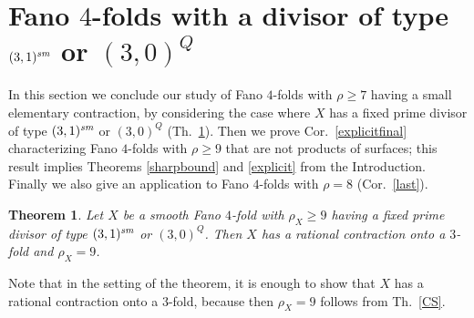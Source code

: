 \documentclass[a4paper,12pt]{amsart}
\newtheorem{thm}{Theorem}[section]
\theoremstyle{definition}
\numberwithin{figure}{section}
\numberwithin{table}{section}
\newcommand{\sm}{\text{\it sm}}
\begin{document}
\section{Fano $4$-folds with a divisor of type $(3,1)^{\sm}$ or $(3,0)^Q$}\label{secsmall}
\noindent In this section we conclude our study of Fano $4$-folds with $\rho\geq 7$ having a small elementary contraction, by considering the case where $X$ has a fixed prime divisor of type $(3,1)^{\sm}$ or $(3,0)^Q$ (Th.~\ref{31}). Then we prove Cor.~\ref{explicitfinal} characterizing Fano $4$-folds with $\rho\geq 9$ that are not products of surfaces; this result implies
Theorems \ref{sharpbound} and \ref{explicit} from the Introduction. Finally we also give an application to Fano $4$-folds with $\rho =8$ (Cor.~\ref{last}).
  \begin{thm}\label{31}
  Let $X$ be a smooth Fano $4$-fold  with $\rho_X\geq 9$ having a fixed prime divisor of type $(3,1)^{\sm}$ or $(3,0)^Q$. Then 
  $X$ has a rational contraction onto a $3$-fold and $\rho_X=9$. 
\end{thm}
Note that in the setting of the theorem, it is enough to show that $X$ has a rational contraction onto a $3$-fold, because then $\rho_X=9$ follows from Th.~\ref{CS}.
\end{document}
